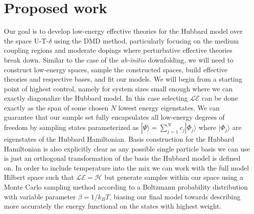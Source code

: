 \documentclass[12pt]{article}
\begin{document}
\section{Proposed work}
Our goal is to develop low-energy effective theories for the
Hubbard model over the space U-T-$\delta$ using the DMD method, particularly focusing on the medium coupling regions and moderate dopings where perturbative effective theories break down.
Similar to the case of the \textit{ab-initio} downfolding, we will need to construct low-energy spaces, sample the constructed spaces, build effective theories and respective bases, and fit our models.
We will begin from a starting point of highest control, namely for system sizes small enough where we can exactly diagonalize the Hubbard model.
In this case selecting $\mathcal{LE}$ can be done exactly as the span of some chosen $N$ lowest energy eigenstates. 
We can guarantee that our sample set fully encapsulates all low-energy degrees of freedom by sampling states parameterized as $|\Psi\rangle = \sum_{j=1}^N c_j |\Phi_j\rangle$ where $|\Phi_j\rangle$ are eigenstates of the Hubbard Hamiltonian.
Basis construction for the Hubbard Hamiltonian is also explicitly clear as any possible single particle basis we can use is just an orthogonal transformation of the basis the Hubbard model is defined on.
In order to include temperature into the mix we can work with the full model Hilbert space such that $\mathcal{LE} = \mathcal{H}$ but generate samples within our space using a Monte Carlo sampling method according to a Boltzmann probability distribution with variable parameter $\beta = 1/k_BT$, biasing our final model towards describing more accurately the energy functional on the states with highest weight.
\end{document}
